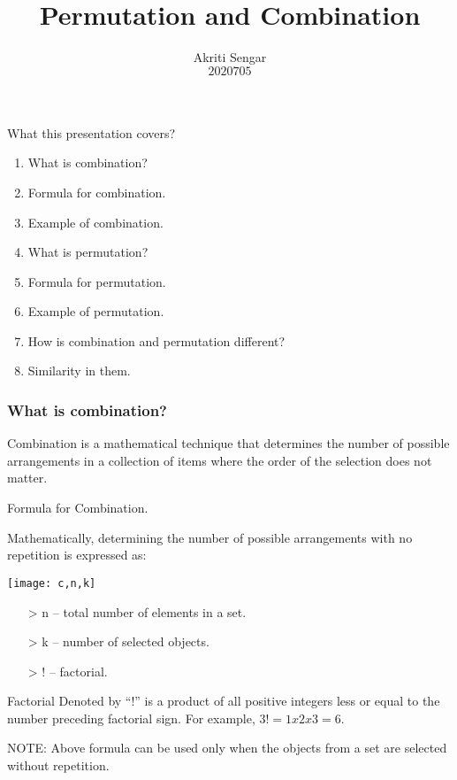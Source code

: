 \documentclass{beamer}
\author{Akriti Sengar \\ $2020705$}
\title{Permutation and Combination}
\institute{Shaheed Rajguru College of Applied Sciences for Women \\ University of Delhi, Delhi:- $110096$, India}
\begin{document}
	\maketitle
	\begin{frame}{What this presentation covers?}	
		\begin{enumerate}
			\item What is combination?
			\item Formula for combination.
			\item Example of combination.
			\item What is permutation?
			\item Formula for permutation.
			\item Example of permutation.
			\item How is combination and permutation different?
			\item Similarity in them.
		\end{enumerate}
	\end{frame}
	
	\begin{frame}\frametitle{What is combination?}
		\begin{block}{}
		Combination is a mathematical technique that determines the number of possible arrangements in a collection of items where the order of the selection does not matter.
		\end{block}
	\end{frame}
	
	\begin{frame}{Formula for Combination.}
		\begin{block}{}
		Mathematically, determining the number of possible arrangements with no repetition is expressed as: \pause
		\end{block}
		\texttt{[image: c,n,k]}
		\begin{itemize}
			\item[>] n – total number of elements in a set.\\
			\item[>] k – number of selected objects.\\
			\item[>] ! – factorial.
		\end{itemize}\pause
		\begin{block}{Factorial}
			Denoted by “!” is a product of all positive integers less or equal to the number preceding factorial sign. For example, $3! = 1 x 2 x 3 = 6$. \\
		\end{block}\pause
		\begin{block}{NOTE:}
			Above formula can be used only when the objects from a set are selected without repetition.
		\end{block}
	\end{frame}
	
\end{document}
